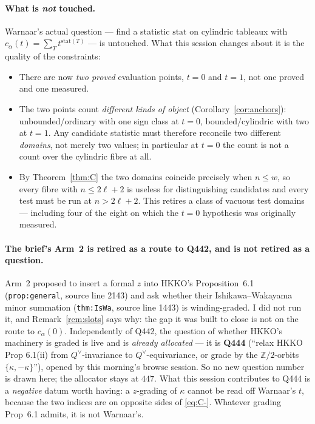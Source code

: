 \documentclass[11pt]{article}
\theoremstyle{plain}
\theoremstyle{definition}
\newcommand{\Z}{\mathbb{Z}}
\begin{document}
\paragraph{What is \emph{not} touched.}  Warnaar's actual question --- find a statistic
$\mathrm{stat}$ on cylindric tableaux with
$c_\alpha(t)=\sum_T t^{\mathrm{stat}(T)}$ --- is untouched.  What this session changes about
it is the quality of the constraints:
\begin{itemize}
\item There are now \emph{two proved} evaluation points, $t=0$ and $t=1$, not one proved
  and one measured.
\item The two points count \emph{different kinds of object} (Corollary~\ref{cor:anchors}):
  unbounded/ordinary with one sign class at $t=0$, bounded/cylindric with two at $t=1$.  Any
  candidate statistic must therefore reconcile two different \emph{domains}, not merely two
  values; in particular at $t=0$ the count is not a count over the cylindric fibre at all.
\item By Theorem~\ref{thm:C} the two domains coincide precisely when $n\le w$, so every
  fibre with $n\le 2\ell+2$ is useless for distinguishing candidates and every test must be
  run at $n>2\ell+2$.  This retires a class of vacuous test domains --- including four of
  the eight on which the $t=0$ hypothesis was originally measured.
\end{itemize}

\paragraph{The brief's Arm~2 is retired as a route to Q442, and is not retired as a
question.}  Arm~2 proposed to insert a formal $z$ into HKKO's Proposition~6.1
(\texttt{prop:general}, source line 2143) and ask whether their Ishikawa--Wakayama minor
summation (\texttt{thm:IsWa}, source line 1443) is winding-graded.  I did not run it, and
Remark~\ref{rem:slots} says why: the gap it was built to close is not on the route to
$c_\alpha(0)$.  Independently of Q442, the question of whether HKKO's machinery is graded is
live and is \emph{already allocated} --- it is \textbf{Q444} (``relax HKKO Prop 6.1(ii) from
$Q^\vee$-invariance to $Q^\vee$-equivariance, or grade by the $\Z/2$-orbits
$\{\kappa,-\kappa\}$''), opened by this morning's browse session.  So no new question number
is drawn here; the allocator stays at $447$.  What this session contributes to Q444 is a
\emph{negative} datum worth having: a $z$-grading of $\kappa$ cannot be read off Warnaar's
$t$, because the two indices are on opposite sides of \eqref{eq:C-}.  Whatever grading
Prop~6.1 admits, it is not Warnaar's.
\end{document}
